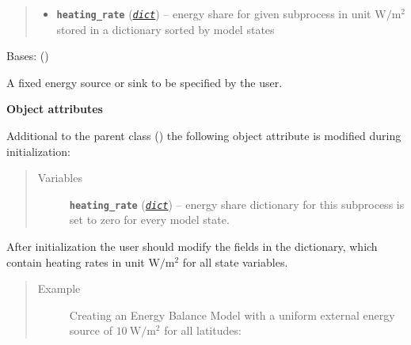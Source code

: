 \documentclass[a4paper,10pt,english]{sphinxmanual}
\begin{document}
\begin{fulllineitems}
\begin{quote}
\begin{description}
\begin{itemize}
\item {} 
\textbf{\texttt{heating\_rate}} (\href{http://docs.python.org/2.7/library/stdtypes.html\#dict}{\emph{\texttt{dict}}}) -- energy share for given subprocess in unit 
\(\textrm{W}/ \textrm{m}^2\) stored 
in a dictionary sorted by model states

\end{itemize}

\end{description}\end{quote}

\end{fulllineitems}


\begin{fulllineitems}
\label{api/climlab.process:climlab.process.energy_budget.ExternalEnergySource}
Bases: {\hyperref[api/climlab.process:climlab.process.energy_budget.EnergyBudget]{\emph{}}} ()

A fixed energy source or sink to be specified by the user.

\textbf{Object attributes}

Additional to the parent class {\hyperref[api/climlab.process:climlab.process.energy_budget.EnergyBudget]{\emph{}}} ()
the following object attribute is modified during initialization:
\begin{quote}\begin{description}
\item[{Variables}] \leavevmode
\textbf{\texttt{heating\_rate}} (\href{http://docs.python.org/2.7/library/stdtypes.html\#dict}{\emph{\texttt{dict}}}) -- energy share dictionary for this subprocess
is set to zero for every model state.

\end{description}\end{quote}

After initialization the user should modify the fields in the 
 dictionary, which contain heating rates in 
unit \(\textrm{W}/ \textrm{m}^2\) for all state variables.
\begin{quote}\begin{description}
\item[{Example}] \leavevmode
Creating an Energy Balance Model with a uniform external energy source
of \(10 \ \textrm{W}/ \textrm{m}^2\) for all latitudes:


\end{description}
\end{quote}
\end{fulllineitems}
\end{document}
